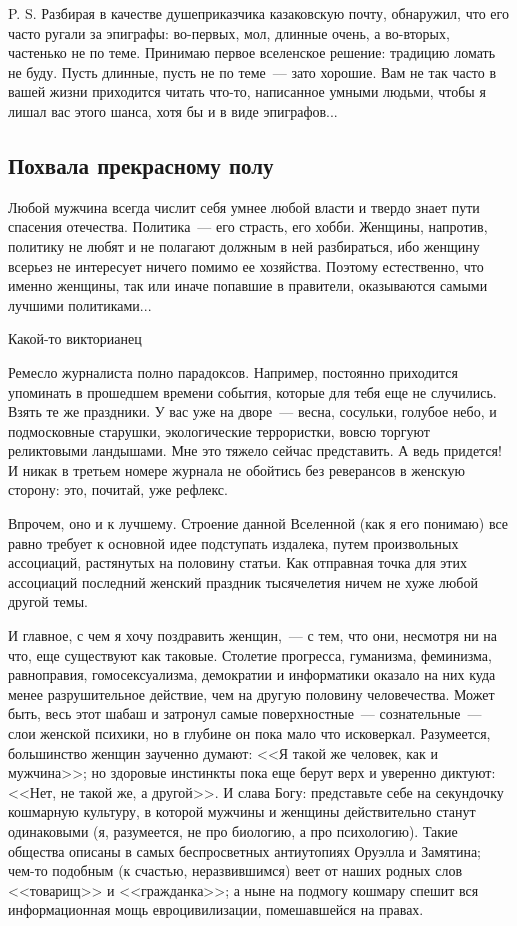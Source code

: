 \documentclass{scrbook}
\makeatletter
\newcommand{\isAFourOneside}{\boolexpr{\value{bookformat} = \value{bfAFourOneside}}}
\newcommand{\isAFourTwoside}{\boolexpr{\value{bookformat} = \value{bfAFourTwoside}}}
\newcommand{\isAFour}{\boolexpr{\isAFourOneside \OR \isAFourTwoside}}
\newcommand{\bigepigraphwidth}{0.8} %
\newcommand{\defaultepigraphwidth}{0.5} %
\newcommand{\flqq}{<<}
\newcommand{\frqq}{>>}
\newcommand{\mdash}{~--- }
\newcommand{\commamdash}{~--- } %
\newcommand{\essaysection}[1]{\subsection*{#1}\nopagebreak}
\newcommand{\myepigraph}[3][\@empty]{
	\ifx\@empty#1
		\setlength{\epigraphwidth}{\defaultepigraphwidth\textwidth}
	\else
		\setlength{\epigraphwidth}{#1\textwidth}
	\fi
	\epigraph{#2}{#3}
	\setlength{\epigraphwidth}{\defaultepigraphwidth\textwidth} %
	\nopagebreak
}
\makeatother
\begin{document}
P. S. Разбирая в качестве душеприказчика казаковскую почту, обнаружил, что его часто ругали за эпиграфы: во-первых, мол, длинные очень, а во-вторых, частенько не по теме. Принимаю первое вселенское решение: традицию ломать не буду. Пусть длинные, пусть не по теме{\mdash}зато хорошие. Вам не так часто в вашей жизни приходится читать что-то, написанное умными людьми, чтобы я лишал вас этого шанса, хотя бы и в виде эпиграфов...

\ifcase\isAFour
	\pagebreak
\fi

\essaysection{Похвала прекрасному полу}

\myepigraph[\bigepigraphwidth]{Любой мужчина всегда числит себя умнее любой власти и твердо знает пути спасения отечества. Политика{\mdash}его страсть, его хобби. Женщины, напротив, политику не любят и не полагают должным в ней разбираться, ибо женщину всерьез не интересует ничего помимо ее хозяйства. Поэтому естественно, что именно женщины, так или иначе попавшие в правители, оказываются самыми лучшими политиками...}
{Какой-то викторианец}

Ремесло журналиста полно парадоксов. Например, постоянно приходится упоминать в прошедшем времени события, которые для тебя еще не случились. Взять те же праздники. У вас уже на дворе{\mdash}весна, сосульки, голубое небо, и подмосковные старушки, экологические террористки, вовсю торгуют реликтовыми ландышами. Мне это тяжело сейчас представить. А ведь придется! И никак в третьем номере журнала не обойтись без реверансов в женскую сторону: это, почитай, уже рефлекс.

Впрочем, оно и к лучшему. Строение данной Вселенной (как я его понимаю) все равно требует к основной идее подступать издалека, путем произвольных ассоциаций, растянутых на половину статьи. Как отправная точка для этих ассоциаций последний женский праздник тысячелетия ничем не хуже любой другой темы.

И главное, с чем я хочу поздравить женщин,{\commamdash}с тем, что они, несмотря ни на что, еще существуют как таковые. Столетие прогресса, гуманизма, феминизма, равноправия, гомосексуализма, демократии и информатики оказало на них куда менее разрушительное действие, чем на другую половину человечества. Может быть, весь этот шабаш и затронул самые поверхностные{\mdash}сознательные{\mdash}слои женской психики, но в глубине он пока мало что исковеркал. Разумеется, большинство женщин заученно думают: {\flqq}Я такой же человек, как и мужчина{\frqq}; но здоровые инстинкты пока еще берут верх и уверенно диктуют: {\flqq}Нет, не такой же, а другой{\frqq}. И слава Богу: представьте себе на секундочку кошмарную культуру, в которой мужчины и женщины действительно станут одинаковыми (я, разумеется, не про биологию, а про психологию). Такие общества описаны в самых беспросветных антиутопиях Оруэлла и Замятина; чем-то подобным (к счастью, неразвившимся) веет от наших родных слов {\flqq}товарищ{\frqq} и {\flqq}гражданка{\frqq}; а ныне на подмогу кошмару спешит вся информационная мощь евроцивилизации, помешавшейся на правах.
\end{document}
